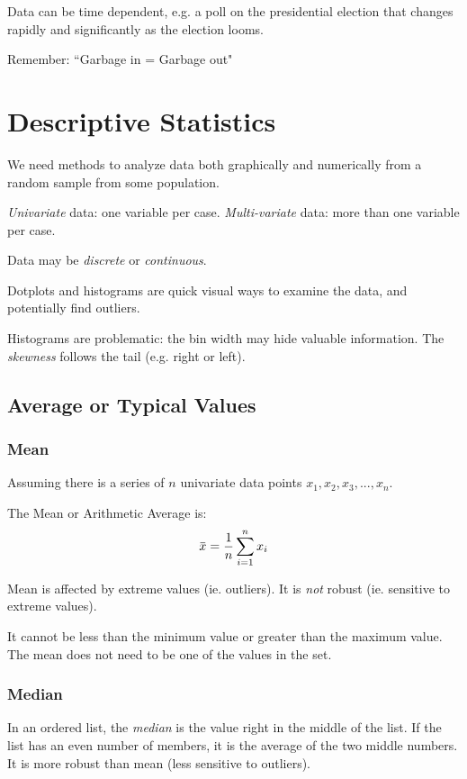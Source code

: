 \documentclass[11pt, oneside]{article}   	%
\newcommand{\overbar}[1]{\mkern 1.5mu\overline{\mkern-1.5mu#1\mkern-1.5mu}\mkern 1.5mu}
\begin{document}
Data can be time dependent, e.g. a poll on the presidential election that changes rapidly and significantly as the election looms. 

Remember: ``Garbage in = Garbage out"

\section{Descriptive Statistics}

We need methods to analyze data both graphically and numerically from a random sample from some population.

\textit{Univariate} data: one variable per case. \textit{Multi-variate} data: more than one variable per case.

Data may be \textit{discrete} or \textit{continuous}. 

Dotplots and histograms are quick visual ways to examine the data, and potentially find outliers.

Histograms are problematic: the bin width may hide valuable information. The \textit{skewness} follows the tail (e.g. right or left).

\subsection{Average or Typical Values}

\subsubsection{Mean}

Assuming there is a series of $n$ univariate data points $x_1, x_2, x_3, ..., x_n$.

The Mean or Arithmetic Average is:
\[
\overbar{x} = \frac{1}{n} \sum\limits_{i=1}^n x_i
\]

Mean is affected by extreme values (ie. outliers). It is \textit{not} robust (ie. sensitive to extreme values).

It cannot be less than the minimum value or greater than the maximum value. The mean does not need to be one of the values in the set.

\subsubsection{Median}

In an ordered list, the \textit{median} is the value right in the middle of the list. If the list has an even number of members, it is the average of the two middle numbers. It is more robust than mean (less sensitive to outliers).
\end{document}
